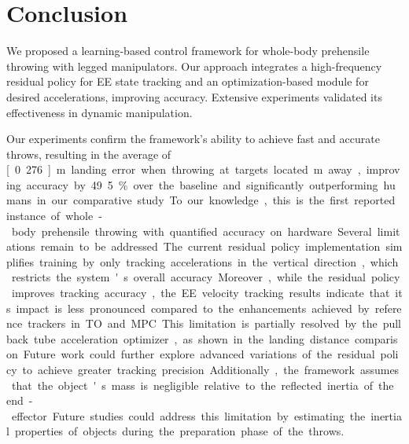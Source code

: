\documentclass[letterpaper, 10 pt, conference]{ieeeconf} %
\begin{document}
\section{Conclusion} %

We proposed a learning-based control framework for whole-body prehensile throwing with legged manipulators. Our approach integrates a high-frequency residual policy for EE state tracking and an optimization-based module for desired accelerations, improving accuracy. Extensive experiments validated its effectiveness in dynamic manipulation.


Our experiments confirm the framework’s ability to achieve fast and accurate throws, resulting in the average of \unit[0.276]{m} landing error when throwing at targets located \unit[6]{m} away, improving accuracy by 49.5\% over the baseline and significantly outperforming humans in our comparative study. To our knowledge, this is the first reported instance of whole-body prehensile throwing with quantified accuracy on hardware.

Several limitations remain to be addressed. The current residual policy implementation simplifies training by only tracking accelerations in the vertical direction, which restricts the system's overall accuracy. Moreover, while the residual policy improves tracking accuracy, the EE velocity tracking results indicate that its impact is less pronounced compared to the enhancements achieved by reference trackers in TO and MPC. This limitation is partially resolved by the pullback tube acceleration optimizer, as shown in the landing distance comparison. Future work could further explore advanced variations of the residual policy to achieve greater tracking precision. Additionally, the framework assumes that the object's mass is negligible relative to the reflected inertia of the end-effector. Future studies could address this limitation by estimating the inertial properties of objects during the preparation phase of the throws.



%
\end{document}

